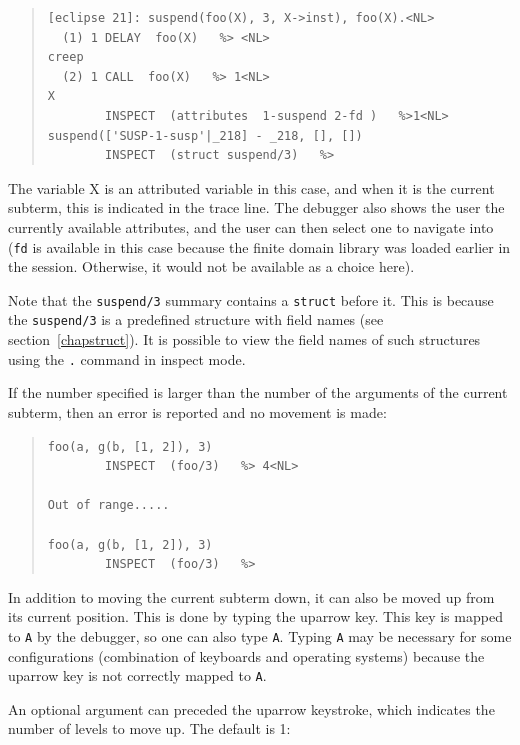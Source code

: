 \begin{descr}{1cm}
\begin{quote}\begin{verbatim}
[eclipse 21]: suspend(foo(X), 3, X->inst), foo(X).<NL>
  (1) 1 DELAY  foo(X)   %> <NL>
creep
  (2) 1 CALL  foo(X)   %> 1<NL>
X
        INSPECT  (attributes  1-suspend 2-fd )   %>1<NL> 
suspend(['SUSP-1-susp'|_218] - _218, [], [])
        INSPECT  (struct suspend/3)   %> 
\end{verbatim}\end{quote}

The variable X is an attributed variable in this case, and when it is the
current subterm, this is indicated in the trace line. The debugger also
shows the user the currently available attributes, and the user can then
select one to navigate into (\verb'fd' is available in
this case because the finite domain library was loaded earlier in the
session. Otherwise, it would not be available as a choice here). 

Note that the \verb'suspend/3' summary contains a \verb'struct' before
it. This is because the \verb'suspend/3' is a predefined structure with
field names (see section~\ref{chapstruct}). It is possible to view the
field names of such structures using the \verb'.' command in inspect mode.

If the number specified is larger than the number of the arguments of the
current subterm, then an error is reported and no movement is made:

\begin{quote}\begin{verbatim}
foo(a, g(b, [1, 2]), 3)
        INSPECT  (foo/3)   %> 4<NL>

Out of range.....

foo(a, g(b, [1, 2]), 3)
        INSPECT  (foo/3)   %> 
\end{verbatim}\end{quote}




In addition to moving the current subterm down, it can also be moved up
from its current position. This is done by typing the uparrow key. This key
is mapped to \verb'A' by the debugger, so one can also type
\verb'A'. Typing \verb'A' may be necessary for some configurations
(combination of keyboards and operating systems) because the uparrow key is
not correctly mapped to \verb'A'.

An optional argument can preceded the uparrow keystroke, which indicates
the number of levels to move up. The default is 1:


\end{descr}
